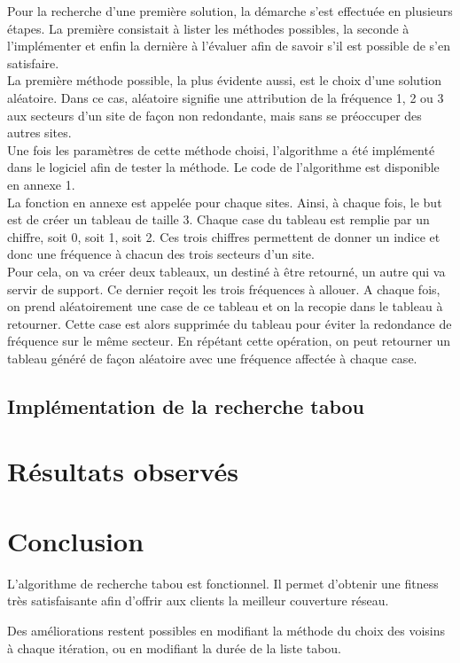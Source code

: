 \documentclass[a4paper, 11pt]{report}
\begin{document}
	Pour la recherche d'une première solution, la démarche s'est effectuée en plusieurs étapes. La première consistait à lister les méthodes possibles, la seconde à l'implémenter et enfin la dernière à l'évaluer afin de savoir s'il est possible de s'en satisfaire.\\
	La première méthode possible, la plus évidente aussi, est le choix d'une solution aléatoire. Dans ce cas, aléatoire signifie une attribution de la fréquence 1, 2 ou 3 aux secteurs d'un site de façon non redondante, mais sans se préoccuper des autres sites.\\
	Une fois les paramètres de cette méthode choisi, l'algorithme a été implémenté dans le logiciel afin de tester la méthode. Le code de l'algorithme est disponible en annexe 1.\\
	La fonction en annexe est appelée pour chaque sites. Ainsi, à chaque fois, le but est de créer un tableau de taille 3. Chaque case du tableau est remplie par un chiffre, soit 0, soit 1, soit 2. Ces trois chiffres permettent de donner un indice et donc une fréquence à chacun des trois secteurs d'un site.\\
	Pour cela, on va créer deux tableaux, un destiné à être retourné, un autre qui va servir de support. Ce dernier reçoit les trois fréquences à allouer. A chaque fois, on prend aléatoirement une case de ce tableau et on la recopie dans le tableau à retourner.  Cette case est alors supprimée du tableau pour éviter la redondance de fréquence sur le même secteur. En répétant cette opération, on peut retourner un tableau généré de façon aléatoire avec une fréquence affectée à chaque case.
	
	
\section{Implémentation de la recherche tabou}

\chapter{Résultats observés}

\chapter{Conclusion}
L'algorithme de recherche tabou est fonctionnel. Il permet d'obtenir une fitness très satisfaisante afin d'offrir aux clients la meilleur couverture réseau.

Des améliorations restent possibles en modifiant la méthode du choix des voisins à chaque itération, ou en modifiant la durée de la liste tabou.\\
\end{document}

